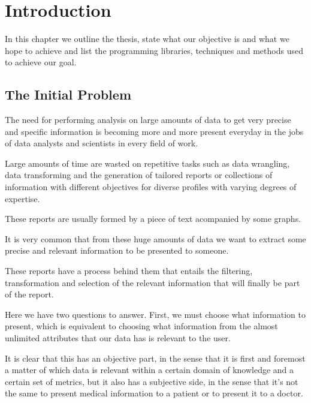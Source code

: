 %
%

\chapter{Introduction}

\begin{resumen}
In this chapter we outline the thesis, state what our objective is and what we hope to achieve and list the programming libraries, techniques and methods used to achieve our goal.
\end{resumen}

\section{The Initial Problem}
\label{cap1:sec:problem}

The need for performing analysis on large amounts of data to get very precise and specific information is becoming more and more present everyday in the jobs of data analysts and scientists in every field of work.

Large amounts of time are wasted on repetitive tasks such as data wrangling, data transforming and the generation of tailored reports or collections of information with different objectives for diverse profiles with varying degrees of expertise.

These reports are usually formed by a piece of text acompanied by some graphs.

It is very common that from these huge amounts of data we want to extract some precise and relevant information to be presented to someone.

These reports have a process behind them that entails the filtering, transformation and selection of the relevant information that will finally be part of the report.

Here we have two questions to answer. First, we must choose what information to present, which is equivalent to choosing what information from the almost unlimited attributes that our data has is relevant to the user. 

It is clear that this has an objective part, in the sense that it is first and foremost a matter of which data is relevant within a certain domain of knowledge and a certain set of metrics, but it also has a subjective side, in the sense that it's not the same to present medical information to a patient or to present it to a doctor. 

